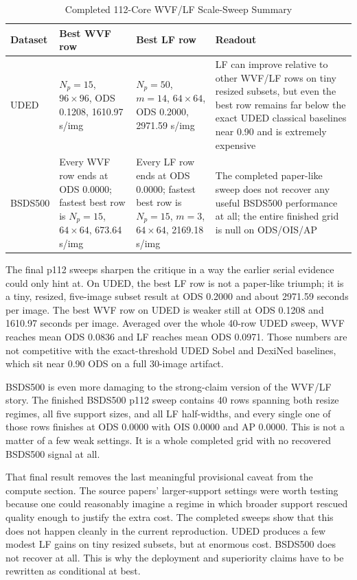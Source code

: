 \documentclass[conference]{IEEEtran}
\begin{document}
\begin{table}[t]
\centering
\caption{Completed 112-Core WVF/LF Scale-Sweep Summary}
\label{tab:scale}
\scriptsize
\begin{tabular}{P{1.4cm}P{4.0cm}P{4.1cm}P{5.0cm}}
\toprule
Dataset & Best WVF row & Best LF row & Readout \\
\midrule
UDED & $N_p=15$, $96\times96$, ODS 0.1208, 1610.97 s/img & $N_p=50$, $m=14$, $64\times64$, ODS 0.2000, 2971.59 s/img & LF can improve relative to other WVF/LF rows on tiny resized subsets, but even the best row remains far below the exact UDED classical baselines near 0.90 and is extremely expensive \\
BSDS500 & Every WVF row ends at ODS 0.0000; fastest best row is $N_p=15$, $64\times64$, 673.64 s/img & Every LF row ends at ODS 0.0000; fastest best row is $N_p=15$, $m=3$, $64\times64$, 2169.18 s/img & The completed paper-like sweep does not recover any useful BSDS500 performance at all; the entire finished grid is null on ODS/OIS/AP \\
\bottomrule
\end{tabular}
\end{table}

The final p112 sweeps sharpen the critique in a way the earlier serial evidence could only hint at. On UDED, the best LF row is not a paper-like triumph; it is a tiny, resized, five-image subset result at ODS 0.2000 and about 2971.59 seconds per image. The best WVF row on UDED is weaker still at ODS 0.1208 and 1610.97 seconds per image. Averaged over the whole 40-row UDED sweep, WVF reaches mean ODS 0.0836 and LF reaches mean ODS 0.0971. Those numbers are not competitive with the exact-threshold UDED Sobel and DexiNed baselines, which sit near 0.90 ODS on a full 30-image artifact.

BSDS500 is even more damaging to the strong-claim version of the WVF/LF story. The finished BSDS500 p112 sweep contains 40 rows spanning both resize regimes, all five support sizes, and all LF half-widths, and every single one of those rows finishes at ODS 0.0000 with OIS 0.0000 and AP 0.0000. This is not a matter of a few weak settings. It is a whole completed grid with no recovered BSDS500 signal at all.

That final result removes the last meaningful provisional caveat from the compute section. The source papers' larger-support settings were worth testing because one could reasonably imagine a regime in which broader support rescued quality enough to justify the extra cost. The completed sweeps show that this does not happen cleanly in the current reproduction. UDED produces a few modest LF gains on tiny resized subsets, but at enormous cost. BSDS500 does not recover at all. This is why the deployment and superiority claims have to be rewritten as conditional at best.
\end{document}

